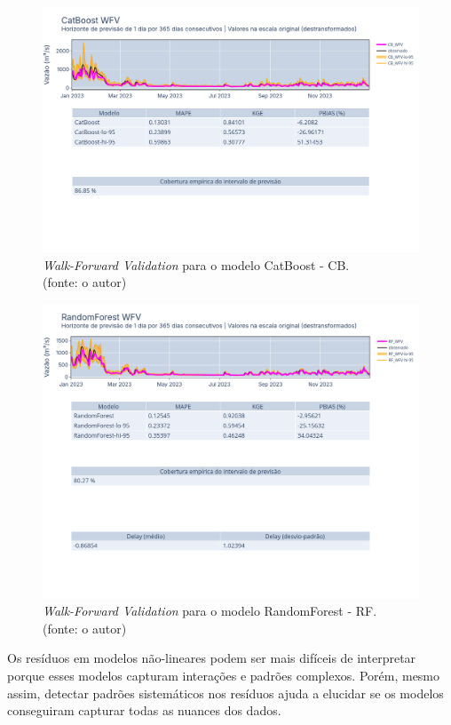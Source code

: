 \begin{figure}[!h]
\centering
\includegraphics[scale=0.33]{Figuras/jequiti/resultados/CB_WFV_LOG.png}
\caption{\textit{Walk-Forward Validation} para o modelo CatBoost - CB.\\(fonte: o autor)}
\label{fig:jequiti_CB_WFV_LOG}
\end{figure}

\begin{figure}[!h]
\centering
\includegraphics[scale=0.33]{Figuras/jequiti/resultados/RF_WFV_LOG.png}
\caption{\textit{Walk-Forward Validation} para o modelo RandomForest - RF.\\(fonte: o autor)}
\label{fig:jequiti_RF_WFV_LOG}
\end{figure}
\clearpage

Os resíduos em modelos não-lineares podem ser mais difíceis de interpretar porque esses modelos capturam interações e padrões complexos. Porém, mesmo assim, detectar padrões sistemáticos nos resíduos ajuda a elucidar se os modelos conseguiram capturar todas as nuances dos dados.

